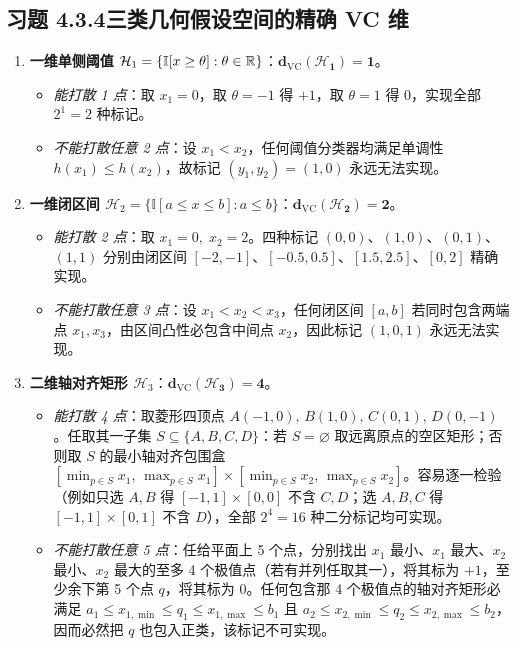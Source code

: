 \subsection*{习题 4.3.4\quad 三类几何假设空间的精确 VC 维}
\begin{enumerate}[label=(\alph*), leftmargin=1.8em]
  \item \textbf{一维单侧阈值 $\mathcal{H}_1 = \{\mathbb{I}[x \ge \theta] : \theta \in \mathbb{R}\}$}：$\mathbf{d_{\mathrm{VC}}(\mathcal{H}_1) = 1}$。
  \begin{itemize}
    \item \emph{能打散 1 点}：取 $x_1 = 0$，取 $\theta = -1$ 得 $+1$，取 $\theta = 1$ 得 $0$，实现全部 $2^1 = 2$ 种标记。
    \item \emph{不能打散任意 2 点}：设 $x_1 < x_2$，任何阈值分类器均满足单调性 $h(x_1) \le h(x_2)$，故标记 $(y_1, y_2) = (1, 0)$ 永远无法实现。
  \end{itemize}

  \item \textbf{一维闭区间 $\mathcal{H}_2 = \{\mathbb{I}[a \le x \le b] : a \le b\}$}：$\mathbf{d_{\mathrm{VC}}(\mathcal{H}_2) = 2}$。
  \begin{itemize}
    \item \emph{能打散 2 点}：取 $x_1 = 0,\; x_2 = 2$。四种标记 $(0,0)$、$(1,0)$、$(0,1)$、$(1,1)$ 分别由闭区间 $[-2,-1]$、$[-0.5, 0.5]$、$[1.5, 2.5]$、$[0, 2]$ 精确实现。
    \item \emph{不能打散任意 3 点}：设 $x_1 < x_2 < x_3$，任何闭区间 $[a, b]$ 若同时包含两端点 $x_1, x_3$，由区间凸性必包含中间点 $x_2$，因此标记 $(1, 0, 1)$ 永远无法实现。
  \end{itemize}

  \item \textbf{二维轴对齐矩形 $\mathcal{H}_3$}：$\mathbf{d_{\mathrm{VC}}(\mathcal{H}_3) = 4}$。
  \begin{itemize}
    \item \emph{能打散 4 点}：取菱形四顶点 $A(-1,0),\, B(1,0),\, C(0,1),\, D(0,-1)$。任取其一子集 $S \subseteq \{A,B,C,D\}$：若 $S = \varnothing$ 取远离原点的空区矩形；否则取 $S$ 的最小轴对齐包围盒 $[\min_{p\in S} x_1,\, \max_{p\in S} x_1] \times [\min_{p\in S} x_2,\, \max_{p\in S} x_2]$。容易逐一检验（例如只选 $A, B$ 得 $[-1,1]\times[0,0]$ 不含 $C, D$；选 $A, B, C$ 得 $[-1,1]\times[0,1]$ 不含 $D$），全部 $2^4 = 16$ 种二分标记均可实现。
    \item \emph{不能打散任意 5 点}：任给平面上 5 个点，分别找出 $x_1$ 最小、$x_1$ 最大、$x_2$ 最小、$x_2$ 最大的至多 4 个极值点（若有并列任取其一），将其标为 $+1$，至少余下第 5 个点 $q$，将其标为 $0$。任何包含那 4 个极值点的轴对齐矩形必满足 $a_1 \le x_{1,\min} \le q_1 \le x_{1,\max} \le b_1$ 且 $a_2 \le x_{2,\min} \le q_2 \le x_{2,\max} \le b_2$，因而必然把 $q$ 也包入正类，该标记不可实现。
  \end{itemize}
\end{enumerate}

